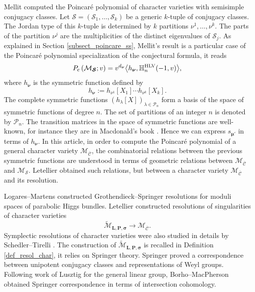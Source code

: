 \documentclass[JEP,XML,SOM,NoEqCountersInSection,Unicode,published]{cedram}
\newcommand{\rc}{\mathrm{c}}
\newcommand{\HLV}{\textup{HLV}}
\newcommand{\blangle}{\bigl\langle}
\newcommand{\brangle}{\bigr\rangle}
\theoremstyle{definition}
\theoremstyle{plain}
\newcommand{\Part}{\mathcal{P}}
\newcommand{\mlps}{\widetilde{\mathcal{M}}_{\boldsymbol{L},\boldsymbol{P},\boldsymbol{\sigma}}}
\newcommand{\mcbar}{\mathcal{M}_{\boldsymbol{\overline{\mathcal{C}}}}}
\begin{document}
Mellit \cite{Mellit2020} computed the Poincaré polynomial of character varieties with semisimple conjugacy classes. Let $\boldsymbol{\mathcal{S}}=\left(\mathcal{S}_1,\dots,\mathcal{S}_k\right)$ be a generic $k$-tuple of conjugacy classes. The Jordan type of this $k$-tuple is determined by $k$ partitions $\nu^1,\dots,\nu^k$. The parts of the partition $\nu^j$ are the multiplicities of the distinct eigenvalues of $\mathcal{S}_j$. As explained in Section \ref{subsect_poincare_ss}, Mellit's result is a particular case of the Poincaré polynomial specialization of the conjectural formula, it reads
\begin{equation}\label{eq_mellit_intro}
P_{\rc} \left(\mathcal{M}_{\boldsymbol{\mathcal{S}}};v\right) = v^{d_{\boldsymbol{\nu}}} \blangle h_{\boldsymbol{\nu}},\mathbb{H}_n^{\HLV}(-1,v)\brangle,
\end{equation}
where $h_{\boldsymbol{\nu}}$ is the symmetric function defined by
\[
h_{\boldsymbol{\nu}}:=h_{\nu^1}[X_1]\cdots h_{\nu^k}[X_k].
\]
The complete symmetric functions $\left(h_{\lambda}[X]\right)_{\lambda \in \Part_n}$ form a basis of the space of symmetric functions of degree $n$. The set of partitions of an integer $n$ is denoted by $\Part_n$. The transition matrices in the space of symmetric functions are well-known, for instance they are in Macdonald's book \cite{Macdonald}. Hence we can express $s_{\boldsymbol{\mu'}}$ in terms of $h_{\boldsymbol{\nu}}$. In this article, in order to compute the Poincaré polynomial of a general character variety $\mcbar$, the combinatorial relations between the previous symmetric functions are understood in terms of geometric relations between $\mcbar$ and $\mathcal{M}_{\boldsymbol{\mathcal{S}}}$. Letellier obtained such relations, but between a character variety $\mcbar$ and its resolution.


Logares--Martens \cite{Logares_Martens} constructed Grothendieck--Springer resolutions for moduli spaces of parabolic Higgs bundles. Letellier \cite{Letellier13} constructed resolutions of singularities of character varieties
\[
\mlps\to\mcbar.
\]
Symplectic resolutions of character varieties were also studied in details by Schedler--Tirelli \cite{Schedler_Tirelli}. The construction of $\mlps$ is recalled in Definition \ref{def_resol_char}, it relies on Springer theory. Springer \cite{Springer1976} proved a correspondence between unipotent conjugacy classes and representations of Weyl groups. Following work of Lusztig \cite{Lusztig81} for the general linear group, Borho--MacPherson \cite{Borho_MacPherson} obtained Springer correspondence in terms of intersection cohomology.
\end{document}
